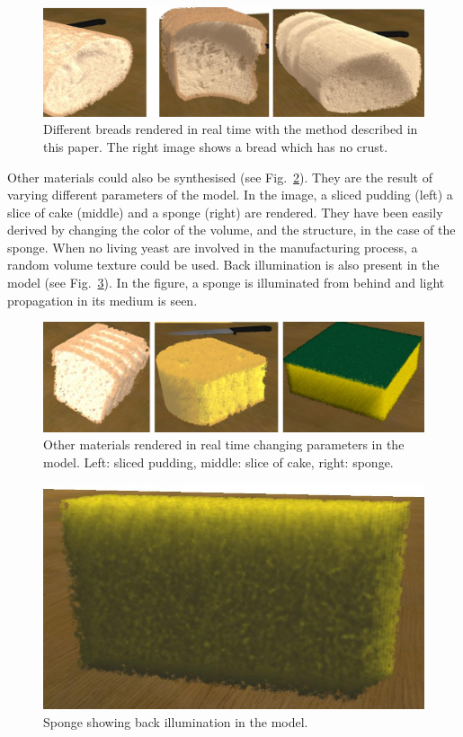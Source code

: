 \documentclass[oneside,a4paper,english,links]{amca}
\begin{document}
\begin{figure}[htb!]
  \centerline{\includegraphics[scale=0.3]{fig5}}
  \caption{Different breads rendered in real time with the method described in this paper. The right image shows a bread which has no crust. }
  \label{fg:fig5}
\end{figure}

Other materials could also be synthesised (see
Fig.~\ref{fg:fig6}). They are the result of varying different
parameters of the model. In the image, a sliced pudding (left) a slice
of cake (middle) and a sponge (right) are rendered. They have been
easily derived by changing the color of the volume, and the structure,
in the case of the sponge. When no living yeast are involved in the
manufacturing process, a random volume texture could be used. Back
illumination is also present in the model (see Fig.~\ref{fg:fig7}). In
the figure, a sponge is illuminated from behind and light propagation
in its medium is seen.

\begin{figure}[htb!]
  \centerline{\includegraphics[scale=0.3]{fig6}}
  \caption{Other materials rendered in real time changing parameters in the model. Left: sliced pudding, middle: slice of cake, right: sponge. }
  \label{fg:fig6}
\end{figure}



\begin{figure}[htb!]
  \centerline{\includegraphics[scale=0.25]{fig7}}
  \caption{Sponge showing back illumination in the model. }
  \label{fg:fig7}
\end{figure}
\end{document}

